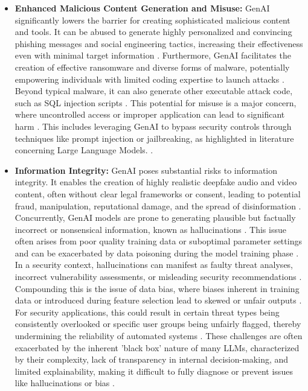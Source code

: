 \begin{itemize}
    \item \textbf{Enhanced Malicious Content Generation and Misuse:} GenAI significantly lowers the barrier for creating sophisticated malicious content and tools. It can be abused to generate highly personalized and convincing phishing messages and social engineering tactics, increasing their effectiveness even with minimal target information \cite{nyoto_cyber_2024}. Furthermore, GenAI facilitates the creation of effective ransomware and diverse forms of malware, potentially empowering individuals with limited coding expertise to launch attacks \cite{nyoto_cyber_2024}. Beyond typical malware, it can also generate other executable attack code, such as SQL injection scripts \cite{nyoto_cyber_2024}. This potential for misuse is a major concern, where uncontrolled access or improper application can lead to significant harm \cite{surathunmanun_exploring_2024}. This includes leveraging GenAI to bypass security controls through techniques like prompt injection or jailbreaking, as highlighted in literature concerning Large Language Models. \cite{surathunmanun_exploring_2024}.

    \item \textbf{Information Integrity:} GenAI poses substantial risks to information integrity. It enables the creation of highly realistic deepfake audio and video content, often without clear legal frameworks or consent, leading to potential fraud, manipulation, reputational damage, and the spread of disinformation \cite{nyoto_cyber_2024}. Concurrently, GenAI models are prone to generating plausible but factually incorrect or nonsensical information, known as hallucinations \cite{nyoto_cyber_2024, surathunmanun_exploring_2024}. This issue often arises from poor quality training data or suboptimal parameter settings \cite{surathunmanun_exploring_2024} and can be exacerbated by data poisoning during the model training phase \cite{nyoto_cyber_2024}. In a security context, hallucinations can manifest as faulty threat analyses, incorrect vulnerability assessments, or misleading security recommendations \cite{surathunmanun_exploring_2024}. Compounding this is the issue of data bias, where biases inherent in training data or introduced during feature selection lead to skewed or unfair outputs \cite{surathunmanun_exploring_2024}. For security applications, this could result in certain threat types being consistently overlooked or specific user groups being unfairly flagged, thereby undermining the reliability of automated systems \cite{surathunmanun_exploring_2024}. These challenges are often exacerbated by the inherent 'black box' nature of many LLMs, characterized by their complexity, lack of transparency in internal decision-making, and limited explainability, making it difficult to fully diagnose or prevent issues like hallucinations or bias \cite{noauthor_zero-trust_nodate}.


\end{itemize}
